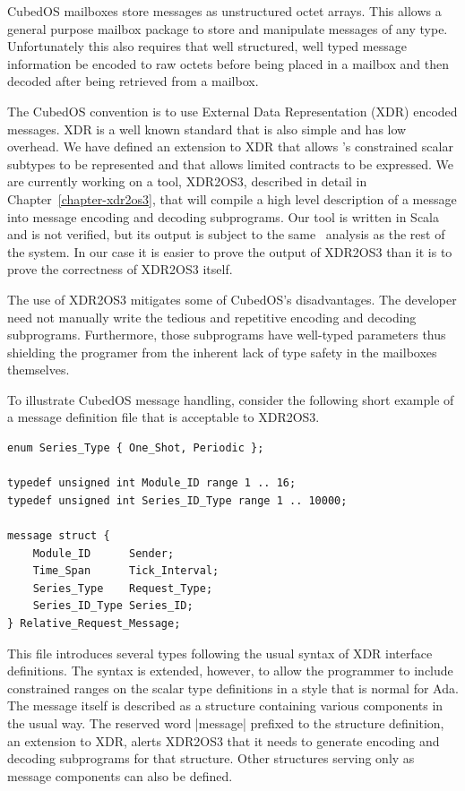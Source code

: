 CubedOS mailboxes store messages as unstructured octet arrays. This allows a general purpose
mailbox package to store and manipulate messages of any type. Unfortunately this also requires
that well structured, well typed message information be encoded to raw octets before being
placed in a mailbox and then decoded after being retrieved from a mailbox.

The CubedOS convention is to use External Data Representation (XDR) encoded messages. XDR is a
well known standard \cite{rfc-4506} that is also simple and has low overhead. We have defined an
extension to XDR that allows \SPARK's constrained scalar subtypes to be represented and that
allows limited contracts to be expressed. We are currently working on a tool, XDR2OS3, described
in detail in Chapter~\ref{chapter-xdr2os3}, that will compile a high level description of a
message into message encoding and decoding subprograms. Our tool is written in Scala and is not
verified, but its output is subject to the same \SPARK\ analysis as the rest of the system. In
our case it is easier to prove the output of XDR2OS3 than it is to prove the correctness of
XDR2OS3 itself.

The use of XDR2OS3 mitigates some of CubedOS's disadvantages. The developer need not manually
write the tedious and repetitive encoding and decoding subprograms. Furthermore, those
subprograms have well-typed parameters thus shielding the programer from the inherent lack of
type safety in the mailboxes themselves.

To illustrate CubedOS message handling, consider the following short example of a message
definition file that is acceptable to XDR2OS3.

\begin{verbatim}
enum Series_Type { One_Shot, Periodic };

typedef unsigned int Module_ID range 1 .. 16;
typedef unsigned int Series_ID_Type range 1 .. 10000;

message struct {
    Module_ID      Sender;
    Time_Span      Tick_Interval;
    Series_Type    Request_Type;
    Series_ID_Type Series_ID;
} Relative_Request_Message;
\end{verbatim}

This file introduces several types following the usual syntax of XDR interface definitions. The
syntax is extended, however, to allow the programmer to include constrained ranges on the scalar
type definitions in a style that is normal for Ada. The message itself is described as a
structure containing various components in the usual way. The reserved word |message|
prefixed to the structure definition, an extension to XDR, alerts XDR2OS3 that it needs to
generate encoding and decoding subprograms for that structure. Other structures serving only as
message components can also be defined.

